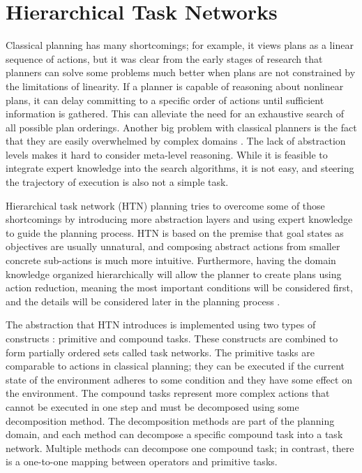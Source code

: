\section{Hierarchical Task Networks}
\label{sec:HTNPlanning}
Classical planning has many shortcomings; for example, 
it views plans as a linear sequence of actions, but it was clear from the early stages of research\cite{NonlinearNaturePlanssacerdoti1975} that planners can solve some problems much better when plans are not constrained by the limitations of linearity. If a planner is capable of reasoning about nonlinear plans, it can delay committing to a specific order of actions until sufficient information is gathered. This can alleviate the need for an exhaustive search of all possible plan orderings. Another big problem with classical planners is the fact that they are easily overwhelmed by complex domains \cite{PracticalPlanningExtendingwilkins1989}. The lack of abstraction levels makes it hard to consider meta-level reasoning. While it is feasible to integrate expert knowledge into the search algorithms, it is not easy, and steering the trajectory of execution is also not a simple task.

Hierarchical task network (HTN) planning tries to overcome some of those shortcomings by introducing more abstraction layers and using expert knowledge to guide the planning process. HTN is based on the premise that goal states as objectives are usually unnatural, and composing abstract actions from smaller concrete sub-actions is much more intuitive. Furthermore, having the domain knowledge organized hierarchically will allow the planner to create plans using action reduction, meaning the most important conditions will be considered first, and the details will be considered later in the planning process \cite{FormalizingPlanningKnowledgeyang1990}.

The abstraction that HTN introduces is implemented using two types of constructs \cite{PANDAFrameworkHierarchicalholler2021}: primitive and compound tasks. These constructs are combined to form partially ordered sets called task networks. The primitive tasks are comparable to actions in classical planning; they can be executed if the current state of the environment adheres to some condition and they have some effect on the environment. The compound tasks represent more complex actions that cannot be executed in one step and must be decomposed using some decomposition method. The decomposition methods are part of the planning domain, and each method can decompose a specific compound task into a task network. Multiple methods can decompose one compound task; in contrast, there is a one-to-one mapping between operators and primitive tasks.


